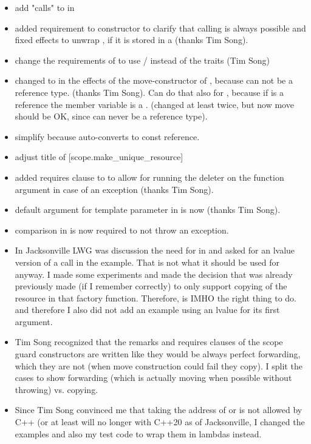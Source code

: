 \documentclass[ebook,11pt,article]{memoir}
\begin{document}
\begin{itemize}
\item add "calls" to  in 
\item added requirement to  constructor to clarify that calling  is always possible and fixed effects to unwrap , if it is stored in a  (thanks Tim Song).
\item change the requirements of  to use / instead of the traits (Tim Song)
\item changed  to  in the effects of the move-constructor of , because  can not be a reference type. (thanks Tim Song). Can do that also for , because if  is a reference the member variable is a . (changed at least twice, but now move should be OK, since  can never be a reference type).
\item simplify  because  auto-converts to const reference.
\item adjust title of [scope.make_unique_resource]
\item added requires clause to  to allow for running the deleter on the function argument in case of an exception (thanks Tim Song).
\item default argument for template parameter  in  is now  (thanks Tim Song).
\item comparison in  is now required to not throw an exception.
\item In Jacksonville LWG was discussion the need for  in  and asked for an lvalue version of a call in the example. That is not what it should be used for anyway. I made some experiments and made the decision that was already previously made (if I remember correctly) to only support copying of the resource in that factory function. Therefore,  is IMHO the right thing to do. and therefore I also did not add an example using an lvalue for its first argument.
\item Tim Song recognized that the remarks and requires clauses of the scope guard constructors are written like they would be always perfect forwarding, which they are not (when move construction could fail they copy). I split the cases to show forwarding (which is actually moving when possible without throwing) vs. copying.
\item Since Tim Song convinced me that taking the address of  or  is not allowed by C++ (or at least will no longer with C++20 as of Jacksonville, I changed the examples and also my test code to wrap them in lambdas instead.
\end{itemize}
\end{document}
